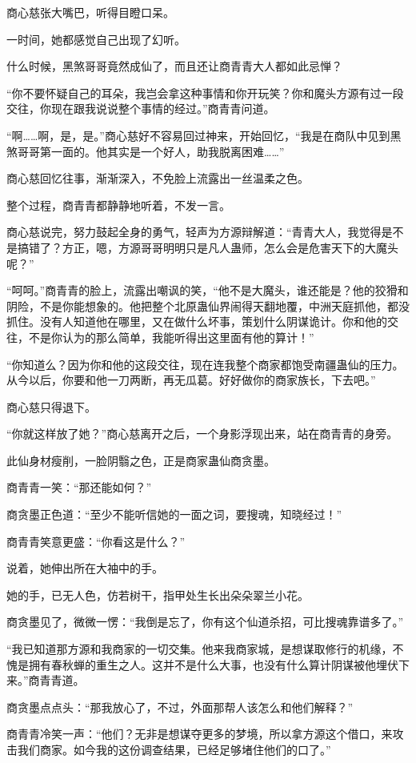 \begin{this_body}
商心慈张大嘴巴，听得目瞪口呆。

一时间，她都感觉自己出现了幻听。

什么时候，黑煞哥哥竟然成仙了，而且还让商青青大人都如此忌惮？

“你不要怀疑自己的耳朵，我岂会拿这种事情和你开玩笑？你和魔头方源有过一段交往，你现在跟我说说整个事情的经过。”商青青问道。

“啊……啊，是，是。”商心慈好不容易回过神来，开始回忆，“我是在商队中见到黑煞哥哥第一面的。他其实是一个好人，助我脱离困难……”

商心慈回忆往事，渐渐深入，不免脸上流露出一丝温柔之色。

整个过程，商青青都静静地听着，不发一言。

商心慈说完，努力鼓起全身的勇气，轻声为方源辩解道：“青青大人，我觉得是不是搞错了？方正，嗯，方源哥哥明明只是凡人蛊师，怎么会是危害天下的大魔头呢？”

“呵呵。”商青青的脸上，流露出嘲讽的笑，“他不是大魔头，谁还能是？他的狡猾和阴险，不是你能想象的。他把整个北原蛊仙界闹得天翻地覆，中洲天庭抓他，都没抓住。没有人知道他在哪里，又在做什么坏事，策划什么阴谋诡计。你和他的交往，不是你认为的那么简单，我能听得出这里面有他的算计！”

“你知道么？因为你和他的这段交往，现在连我整个商家都饱受南疆蛊仙的压力。从今以后，你要和他一刀两断，再无瓜葛。好好做你的商家族长，下去吧。”

商心慈只得退下。

“你就这样放了她？”商心慈离开之后，一个身影浮现出来，站在商青青的身旁。

此仙身材瘦削，一脸阴翳之色，正是商家蛊仙商贪墨。

商青青一笑：“那还能如何？”

商贪墨正色道：“至少不能听信她的一面之词，要搜魂，知晓经过！”

商青青笑意更盛：“你看这是什么？”

说着，她伸出所在大袖中的手。

她的手，已无人色，仿若树干，指甲处生长出朵朵翠兰小花。

商贪墨见了，微微一愣：“我倒是忘了，你有这个仙道杀招，可比搜魂靠谱多了。”

“我已知道那方源和我商家的一切交集。他来我商家城，是想谋取修行的机缘，不愧是拥有春秋蝉的重生之人。这并不是什么大事，也没有什么算计阴谋被他埋伏下来。”商青青道。

商贪墨点点头：“那我放心了，不过，外面那帮人该怎么和他们解释？”

商青青冷笑一声：“他们？无非是想谋夺更多的梦境，所以拿方源这个借口，来攻击我们商家。如今我的这份调查结果，已经足够堵住他们的口了。”


\end{this_body}
